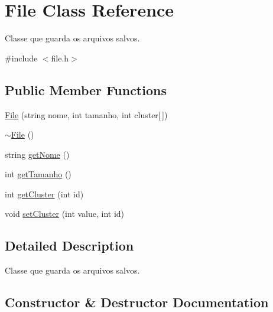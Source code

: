 \hypertarget{classFile}{}\section{File Class Reference}
\label{classFile}


Classe que guarda os arquivos salvos.  




{\ttfamily \#include $<$file.\+h$>$}

\subsection*{Public Member Functions}
\begin{DoxyCompactItemize}
\item 
\hyperlink{classFile_a19ef2ccc877d781b51d351eb18b961cf}{File} (string nome, int tamanho, int cluster\mbox{[}$\,$\mbox{]})
\item 
\hyperlink{classFile_ac704ebdf5f57d7a1c5ddf409d797fb69}{$\sim$\+File} ()
\item 
string \hyperlink{classFile_aaa36b9ad9a33bdc541165cee474c8f8f}{get\+Nome} ()
\item 
int \hyperlink{classFile_a814c53f4c125523cde4e234b774955a5}{get\+Tamanho} ()
\item 
int \hyperlink{classFile_ab207a5854e4c0cc5dbcb001dbf8b9dcc}{get\+Cluster} (int id)
\item 
void \hyperlink{classFile_ae2dd2a90cdbb5ea1ab653fef2b5732fa}{set\+Cluster} (int value, int id)
\end{DoxyCompactItemize}


\subsection{Detailed Description}
Classe que guarda os arquivos salvos. 

\subsection{Constructor \& Destructor Documentation}
\hypertarget{classFile_a19ef2ccc877d781b51d351eb18b961cf}{}
